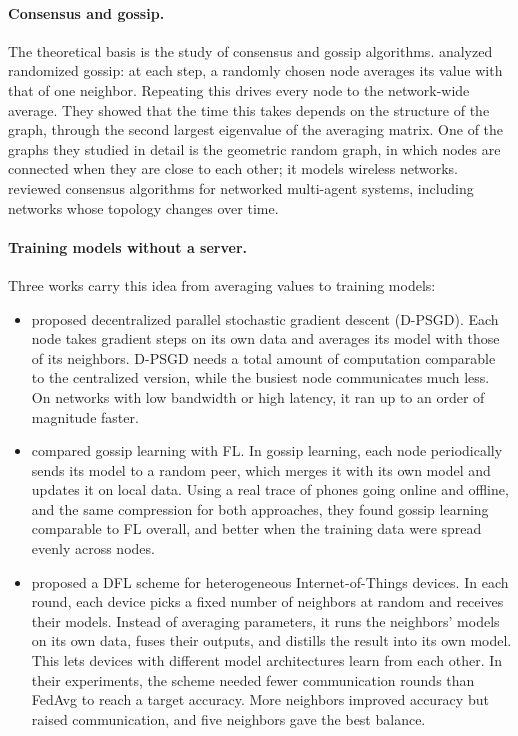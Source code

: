 \paragraph{Consensus and gossip.} The theoretical basis is the study of consensus and gossip algorithms.
\citet{boyd+06gossip} analyzed randomized gossip: at each step, a randomly chosen node averages its value
with that of one neighbor. Repeating this drives every node to the network-wide average. They showed that
the time this takes depends on the structure of the graph, through the second largest eigenvalue of the
averaging matrix. One of the graphs they studied in detail is the geometric random graph, in which nodes
are connected when they are close to each other; it models wireless networks.
\citet{olfatisaber+07consensus} reviewed consensus algorithms for networked multi-agent systems, including
networks whose topology changes over time.

\paragraph{Training models without a server.} Three works carry this idea from averaging values to
training models:
\begin{itemize}
  \item \citet{lian+17dpsgd} proposed decentralized parallel stochastic gradient descent (D-PSGD). Each
    node takes gradient steps on its own data and averages its model with those of its neighbors. D-PSGD
    needs a total amount of computation comparable to the centralized version, while the busiest node
    communicates much less. On networks with low bandwidth or high latency, it ran up to an order of
    magnitude faster.
  \item \citet{hegedus+19gossip} compared gossip learning with \ac{FL}. In gossip learning, each node
    periodically sends its model to a random peer, which merges it with its own model and updates it on
    local data. Using a real trace of phones going online and offline, and the same compression for both
    approaches, they found gossip learning comparable to \ac{FL} overall, and better when the training
    data were spread evenly across nodes.
  \item \citet{ge+24dfl} proposed a \ac{DFL} scheme for heterogeneous Internet-of-Things devices. In each
    round, each device picks a fixed number of neighbors at random and receives their models. Instead of
    averaging parameters, it runs the neighbors' models on its own data, fuses their outputs, and
    distills the result into its own model. This lets devices with different model architectures learn
    from each other. In their experiments, the scheme needed fewer communication rounds than \ac{FedAvg}
    to reach a target accuracy. More neighbors improved accuracy but raised communication, and five
    neighbors gave the best balance.
\end{itemize}

